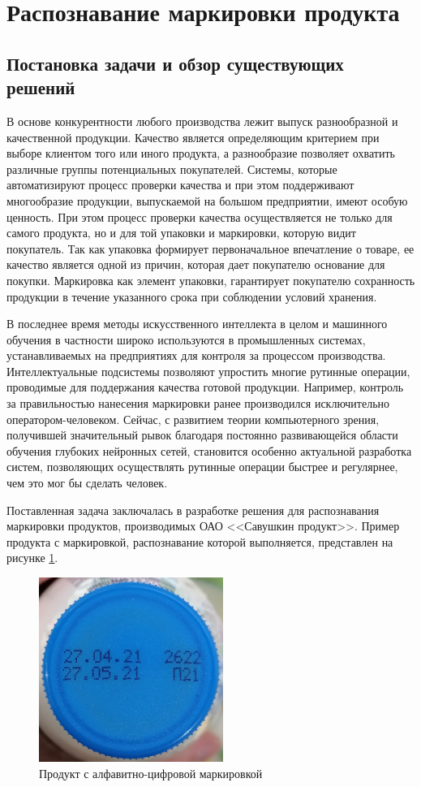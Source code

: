\section{Распознавание маркировки продукта}

\subsection{Постановка задачи и обзор существующих решений}

В основе конкурентности любого производства лежит выпуск разнообразной и качественной продукции. Качество является определяющим критерием при выборе клиентом того или иного продукта, а разнообразие позволяет охватить различные группы потенциальных покупателей. Системы, которые автоматизируют процесс проверки качества и при этом поддерживают многообразие продукции, выпускаемой на большом предприятии, имеют особую ценность. При этом процесс проверки качества осуществляется не только для самого продукта, но и для той упаковки и маркировки, которую видит покупатель. Так как упаковка формирует первоначальное впечатление о товаре, ее качество является одной из причин, которая дает покупателю основание для покупки. Маркировка как элемент упаковки, гарантирует покупателю сохранность продукции в течение указанного срока при соблюдении условий хранения.

В последнее время методы искусственного интеллекта в целом и машинного обучения в частности широко используются в промышленных системах, устанавливаемых на предприятиях для контроля за процессом производства. Интеллектуальные подсистемы позволяют упростить многие рутинные операции, проводимые для поддержания качества готовой продукции. Например, контроль за правильностью нанесения маркировки ранее производился исключительно оператором-человеком. Сейчас, с развитием теории компьютерного зрения, получившей значительный рывок благодаря постоянно развивающейся области обучения глубоких нейронных сетей, становится особенно актуальной разработка систем, позволяющих осуществлять рутинные операции быстрее и регулярнее, чем это мог бы сделать человек.

Поставленная задача заключалась в разработке решения для распознавания маркировки продуктов, производимых ОАО <<Савушкин продукт>>. Пример продукта с маркировкой, распознавание которой выполняется, представлен на рисунке \ref{fig:digital_code}.

\begin{figure}[ht]
	\centering
	\includegraphics[width=6cm]{man-source/images/ch4/pic4-1.jpg}
	\caption{Продукт с алфавитно-цифровой маркировкой}
	\label{fig:digital_code}
\end{figure}


